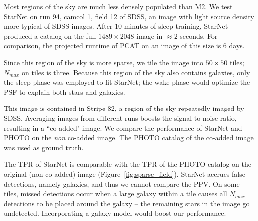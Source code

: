 Most regions of the sky are much less densely populated than M2.
We test StarNet on run 94, camcol 1, field 12 of SDSS,
an image with light source density more typical of SDSS images.
After 10 minutes of sleep training, StarNet produced a catalog on the full $1489\times 2048$ image in $\approx2$ seconds.
For comparison, the projected runtime of PCAT on an image of this size is 6 days.

Since this region of the sky is more sparse, we tile the image into $50\times 50$ tiles; $N_{max}$ on tiles is three.
Because this region of the sky also contains galaxies, only the sleep phase was employed to fit StarNet;
the wake phase would optimize the PSF to explain both stars and galaxies.

This image is contained in Stripe 82, a region of the sky repeatedly imaged by SDSS.
Averaging images from different runs boosts the signal to noise ratio, resulting in a ``co-added" image.
We compare the performance of StarNet and PHOTO on the {\itshape non} co-added image.
The PHOTO catalog of the co-added image was used as ground truth.

The TPR of StarNet is comparable with the TPR of the PHOTO catalog on the original (non co-added) image (Figure~\ref{fig:sparse_field}).
StarNet accrues false detections, namely galaxies, and thus we cannot compare the PPV.
On some tiles, missed detections occur when a large galaxy within a tile causes all $N_{max}$ detections to be placed around the galaxy -- the remaining stars in the image go undetected.
Incorporating a galaxy model would boost our performance.


